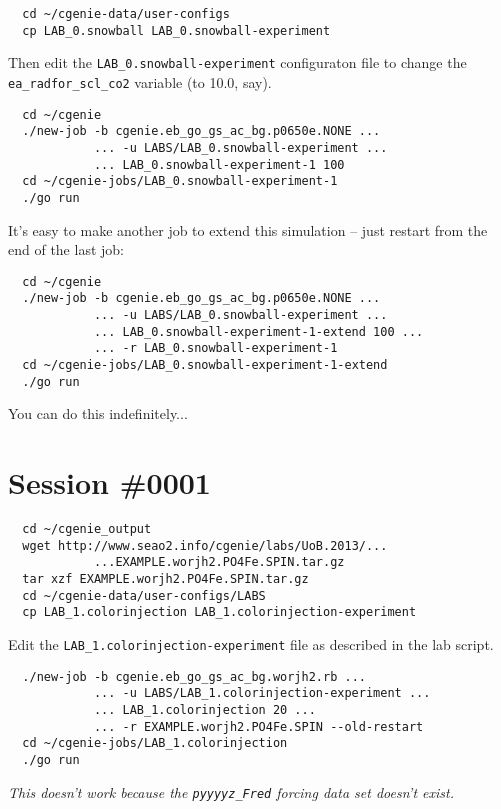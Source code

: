 \documentclass[a4paper,10pt,article]{memoir}
\begin{document}
\begin{verbatim}
  cd ~/cgenie-data/user-configs
  cp LAB_0.snowball LAB_0.snowball-experiment
\end{verbatim}

Then edit the \texttt{LAB\_0.snowball-experiment} configuraton file to
change the \texttt{ea\_radfor\_scl\_co2} variable (to 10.0, say).

\begin{verbatim}
  cd ~/cgenie
  ./new-job -b cgenie.eb_go_gs_ac_bg.p0650e.NONE ...
            ... -u LABS/LAB_0.snowball-experiment ...
            ... LAB_0.snowball-experiment-1 100
  cd ~/cgenie-jobs/LAB_0.snowball-experiment-1
  ./go run
\end{verbatim}

It's easy to make another job to extend this simulation -- just
restart from the end of the last job:
\begin{verbatim}
  cd ~/cgenie
  ./new-job -b cgenie.eb_go_gs_ac_bg.p0650e.NONE ...
            ... -u LABS/LAB_0.snowball-experiment ...
            ... LAB_0.snowball-experiment-1-extend 100 ...
            ... -r LAB_0.snowball-experiment-1
  cd ~/cgenie-jobs/LAB_0.snowball-experiment-1-extend
  ./go run
\end{verbatim}
You can do this indefinitely...

\section{Session \#0001}

\begin{verbatim}
  cd ~/cgenie_output
  wget http://www.seao2.info/cgenie/labs/UoB.2013/...
            ...EXAMPLE.worjh2.PO4Fe.SPIN.tar.gz
  tar xzf EXAMPLE.worjh2.PO4Fe.SPIN.tar.gz
  cd ~/cgenie-data/user-configs/LABS
  cp LAB_1.colorinjection LAB_1.colorinjection-experiment
\end{verbatim}

Edit the \texttt{LAB\_1.colorinjection-experiment} file as described
in the lab script.

\begin{verbatim}
  ./new-job -b cgenie.eb_go_gs_ac_bg.worjh2.rb ...
            ... -u LABS/LAB_1.colorinjection-experiment ...
            ... LAB_1.colorinjection 20 ...
            ... -r EXAMPLE.worjh2.PO4Fe.SPIN --old-restart
  cd ~/cgenie-jobs/LAB_1.colorinjection
  ./go run
\end{verbatim}
\emph{This doesn't work because the \texttt{pyyyyz\_Fred} forcing data
  set doesn't exist.}
\end{document}
